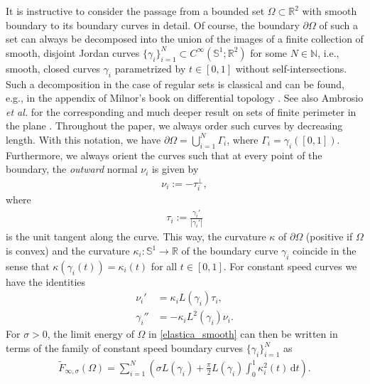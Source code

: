 \documentclass[11pt]{article}
\numberwithin{statement}{section}
\numberwithin{equation}{section}
\theoremstyle{remark}
\newcommand{\R}{\mathbb R} 				%
\newcommand{\N}{\mathbb N}
\newcommand{\intd}{\, \mathrm{d}} 				%
\newcommand{\Sph}{{\mathbb S}}				%
\begin{document}
  It is instructive to consider the passage from a bounded set
  $\Omega \subset \R^2$ with smooth boundary to its boundary curves in
  detail.  Of course, the boundary $\partial \Omega$ of such a set can
  always be decomposed into the union of the images of a finite
  collection of smooth, disjoint Jordan curves
  $\{\gamma_i\}_{i=1}^N \subset C^\infty(\Sph^1; \R^2)$ for some
  $N \in \N$, i.e., smooth, closed curves $\gamma_i$ parametrized by
  $t \in [0,1]$ without self-intersections. Such a decomposition
    in the case of regular sets is classical and can be found, e.g.,
    in the appendix of Milnor's book on differential topology
    \cite{milnor}. See also Ambrosio {\em et al.} for the
    corresponding and much deeper result on sets of finite perimeter
    in the plane \cite{ambrosio01}.  Throughout the paper, we always
  order such curves by decreasing length.  With this notation, we have
  $\partial \Omega = \bigcup_{i=1}^N \Gamma_i$, where
  $\Gamma_i = \gamma_i([0,1])$. Furthermore, we always orient the
  curves such that at every point of the boundary, the \emph{outward}
  normal $\nu_i$ is given by
  \begin{align}\label{eq:chosen_normal}
  	\nu_i := - \tau_i^\perp,
  \end{align}
  where
  \begin{align}
  	\tau_i := \frac{\gamma_i'}{|\gamma_i'|}
  \end{align}
  is the unit tangent along the curve.
  This way, the curvature $\kappa$ of $\partial \Omega$ (positive if
  $\Omega$ is convex) and the curvature $\kappa_i : \Sph^1 \to \R$ of
  the boundary curve $\gamma_i$ coincide in the sense that
  $\kappa(\gamma_i(t)) = \kappa_i(t)$ for all $t \in [0,1]$.  For
  constant speed curves we have the identities
\begin{align}
  \nu_i' & =  \kappa_i L(\gamma_i)
           \tau_i, \label{eq:derivative_normal}\\ 
  \gamma_i'' & = - \kappa_i L^2(\gamma_i)
               \nu_i. \label{eq:second_derivative} 
\end{align}
For $\sigma>0$, the limit energy of $\Omega$ in
\eqref{elastica_smooth} can then be written in terms of the family of
constant speed boundary curves $\{\gamma_i\}_{i=1}^N$ as
\begin{align}
  \tilde F_{\infty,\sigma}(\Omega) = \sum_{i=1}^N \left(
  \sigma L(\gamma_i) + \frac{\pi}{2} L(\gamma_i) \int_0^1
  \kappa_i^2(t) \intd t \right).  
\end{align}
\end{document}
